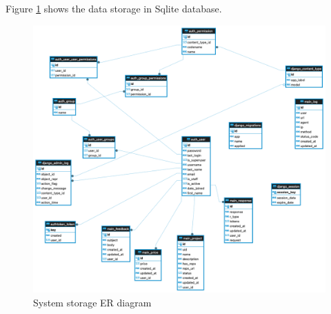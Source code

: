 




Figure \ref{fig:dataStorage} shows the data storage in Sqlite database.

\begin{figure}[H]
    \centering
    \includegraphics[width=0.9\linewidth]{images/ERD.png}
    \caption{System storage ER diagram}
    \label{fig:dataStorage}
\end{figure}

